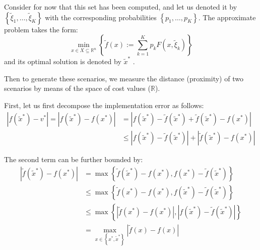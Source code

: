 \documentclass{article}
\theoremstyle{plain}
\theoremstyle{definition}
\begin{document}
Consider for now that this set has been computed, and let us denoted it by  $\left\{\widetilde{\xi}_{1}, \ldots, \widetilde{\xi}_{K}\right\}$  with the corresponding probabilities  $\left\{p_{1}, \ldots, p_{K}\right\}$. The approximate problem takes the form:
$$\min _{x \in X \subseteq \mathbb{R}^{n}}\left\{\widetilde{f}(x):=\sum_{k=1}^{K} p_{k} F(x, \widetilde{\xi}_{k})\right\}$$
and its optimal solution is denoted by  $\widetilde{x}^{*}$ .

Then to generate  these scenarios, we measure the distance (proximity) of two scenarios by means of the space of cost values ($\mathbb{R}$).

First, let us first decompose the implementation error as follows:
\begin{equation}
\begin{aligned}
\left|f\left(\widetilde{x}^{*}\right)-v^{*}\right|=\left|f\left(\widetilde{x}^{*}\right)-f\left(x^{*}\right)\right| &=\left|f\left(\widetilde{x}^{*}\right)-\widetilde{f}\left(\widetilde{x}^{*}\right)+\widetilde{f}\left(\widetilde{x}^{*}\right)-f\left(x^{*}\right)\right| \\
& \leq\left|f\left(\widetilde{x}^{*}\right)-\widetilde{f}\left(\widetilde{x}^{*}\right)\right|+\left|\widetilde{f}\left(\widetilde{x}^{*}\right)-f\left(x^{*}\right)\right|
\end{aligned}
\end{equation}

The second term can be further bounded by:
\begin{equation}
\begin{aligned}
\left|\tilde{f}\left(\widetilde{x}^{*}\right)-f\left(x^{*}\right)\right| &=\max \left\{\widetilde{f}\left(\widetilde{x}^{*}\right)-f\left(x^{*}\right), f\left(x^{*}\right)-\widetilde{f}\left(\widetilde{x}^{*}\right)\right\} \\
& \leq \max \left\{\widetilde{f}\left(x^{*}\right)-f\left(x^{*}\right), f\left(\widetilde{x}^{*}\right)-\widetilde{f}\left(\widetilde{x}^{*}\right)\right\} \\
& \leq \max \left\{\left|\widetilde{f}\left(x^{*}\right)-f\left(x^{*}\right)\right|,\left|f\left(\widetilde{x}^{*}\right)-\widetilde{f}\left(\widetilde{x}^{*}\right)\right|\right\} \\
&=\max _{x \in\left\{x^{*}, \widetilde{x}^{*}\right\}}|\widetilde{f}(x)-f(x)|
\end{aligned}
\end{equation}
\end{document}
